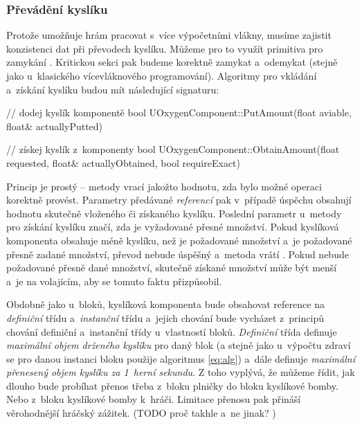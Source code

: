 \subsubsection{Převádění kyslíku}
Protože \UE{} umožňuje hrám pracovat s~více výpočetními vlákny, musíme zajistit konzistenci dat při převodech kyslíku. Můžeme pro to využít primitiva pro zamykání . Kritickou sekci pak budeme korektně zamykat a~odemykat (stejně jako u~klasického vícevláknového programování). Algoritmy pro vkládání a~získání kyslíku budou mít následující signaturu:

\begin{code}
    // dodej kyslík komponentě
    bool UOxygenComponent::PutAmount(float aviable,
                                     float& actuallyPutted)

    // získej kyslík z~komponenty                                     
    bool UOxygenComponent::ObtainAmount(float requested,
                                        float& actuallyObtained,
                                        bool requireExact)
\end{code}

Princip je prostý -- metody vrací  jakožto hodnotu, zda bylo možné operaci korektně provést. Parametry předávané \textit{referencí} pak v~případě úspěchu obsahují hodnotu skutečně vloženého či získaného kyslíku. Poslední parametr u~metody pro získání kyslíku značí, zda je vyžadované přesné množství. Pokud kyslíková komponenta obsahuje méně kyslíku, než je požadované množství a~je požadované přesně zadané množství, převod nebude úspěšný a~metoda vrátí . Pokud nebude požadované přesně dané množství, skutečně získané množství může být menší a~je na volajícím, aby se tomuto faktu přizpůsobil.

Obdobně jako u~bloků, kyslíková komponenta bude obsahovat reference na \textit{definiční} třídu a~\textit{instanční} třídu a~jejich chování bude vycházet z~principů chování definiční a~instanční třídy u~vlastností bloků. \textit{Definiční} třída definuje \textit{maximální objem drženého kyslíku} pro daný blok (a stejně jako u~výpočtu zdraví se pro danou instanci bloku použije algoritmus \ref{eq:alg}) a~dále definuje \textit{maximální přenesený objem kyslíku za 1~herní sekundu}. Z toho vyplývá, že můžeme řídit, jak dlouho bude probíhat přenos třeba z~bloku plničky do bloku kyslíkové bomby. Nebo z~bloku kyslíkové bomby k~hráči. Limitace přenosu pak přináší věrohodnější hráčský zážitek. (TODO proč takhle a~ne jinak? )


